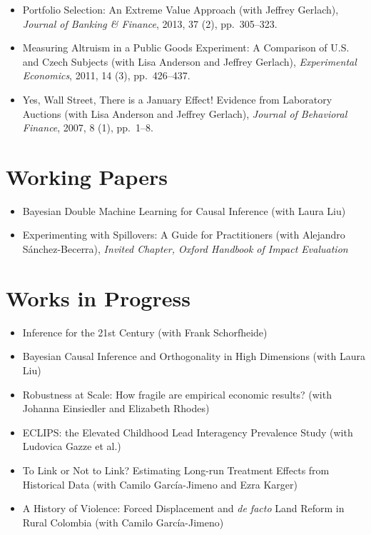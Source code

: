 \documentclass[line,overlapped]{myres}
\begin{document}
\begin{resume}
\begin{itemize}
	\item Portfolio Selection: An Extreme Value Approach (with Jeffrey Gerlach), \emph{Journal of Banking \& Finance}, 2013, 37 (2), pp.\ 305--323.
	\item Measuring Altruism in a Public Goods Experiment: A Comparison of U.S. and Czech Subjects (with Lisa Anderson and Jeffrey Gerlach), \emph{Experimental Economics}, 2011, 14 (3), pp.\ 426--437.
	\item Yes, Wall Street, There is a January Effect! Evidence from Laboratory Auctions (with Lisa Anderson and Jeffrey Gerlach), \emph{Journal of Behavioral Finance}, 2007, 8 (1), pp.\ 1--8. 
\end{itemize}


\section{\sc Working Papers}
\begin{itemize}
  \item Bayesian Double Machine Learning for Causal Inference (with Laura Liu)
  \item Experimenting with Spillovers: A Guide for Practitioners (with Alejandro S\'anchez-Becerra), \emph{Invited Chapter, Oxford Handbook of Impact Evaluation}
\end{itemize}


\section{\sc Works in Progress}
\begin{itemize}
  \item Inference for the 21st Century (with Frank Schorfheide)
  \item Bayesian Causal Inference and Orthogonality in High Dimensions (with Laura Liu)
  \item Robustness at Scale: How fragile are empirical economic results? (with Johanna Einsiedler and Elizabeth Rhodes)
  \item ECLIPS: the Elevated Childhood Lead Interagency Prevalence Study (with Ludovica Gazze et al.) 
  \item To Link or Not to Link? Estimating Long-run Treatment Effects from Historical Data (with Camilo Garc\'{i}a-Jimeno and Ezra Karger) 
  \item A History of Violence: Forced Displacement and \emph{de facto} Land Reform in Rural Colombia (with Camilo Garc\'{i}a-Jimeno)
\end{itemize}


\end{resume}
\end{document}
